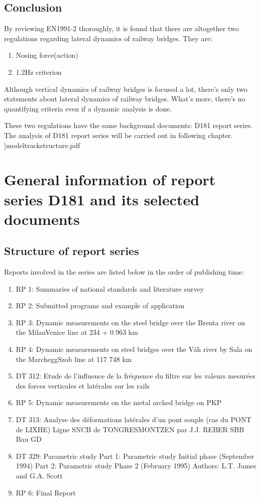 \begin{appendices}
\section{Conclusion}

By reviewing EN1991-2 thoroughly, it is found that there are altogether two regulations regarding lateral dynamics of railway bridges. They are:

\begin{enumerate}
	\item Nosing force(action)
	\item 1.2Hz criterion 
\end{enumerate}

Although vertical dynamics of railway bridges is focused a lot, there's only two statements about lateral dynamics of railway bridges. What's more, there's no quantifying criteria even if a dynamic analysis is done. 

These two regulations have the same background documents: D181 report series. The analysis of D181 report series will be carried out in following chapter.
]{modeltrackstructure.pdf}

\chapter{General information of report series D181 and its selected documents}\label{app:generalInformationD181}

\section{Structure of report series}

Reports involved in the series are listed below in the order of publishing time:

\begin{enumerate}
    \item RP 1: Summaries of national standards and literature survey
    \item RP 2: Submitted programs and example of application
    \item RP 3: Dynamic measurements on the steel bridge over the Brenta river on the MilanVenice line at 234 + 0.963 km
    \item RP 4: Dynamic measurements on steel bridges over the Váh river by Sala on the MarcheggSzob line at 117 748 km
    \item DT 312: Etude de l'influence de la fréquence du filtre sur les valeurs mesurées des forces verticales et latérales sur les rails
    \item RP 5: Dynamic measurements on the metal arched bridge on PKP
    \item DT 313: Analyse des déformations latérales d'un pont souple (cas du PONT de LIXHE) Ligne SNCB de TONGRESMONTZEN par J.J. REBER SBB Bau GD
    \item DT 329: Parametric study Part 1: Parametric study Initial phase (September 1994) Part 2: Parametric study Phase 2 (February 1995) Authors: L.T. James and G.A. Scott
    \item RP 6: Final Report
\end{enumerate}


\end{appendices}

